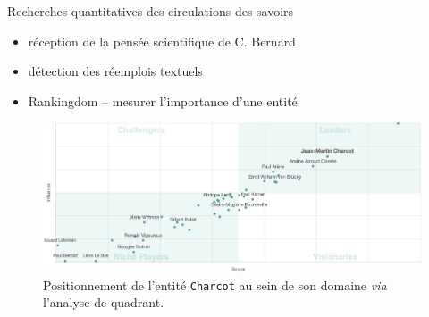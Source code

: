 \begin{frame}{Recherches quantitatives des circulations des savoirs}
	\begin{itemize}
	\item réception de la pensée scientifique de C. Bernard \citep{riguet2018impact}
\item détection des réemplois textuels
\citep{fedchenko2024recherche}
\item Rankingdom -- mesurer l'importance d’une entité \citep{soulet2024}
\end{itemize}
\begin{figure}[!h]
\centering
\includegraphics[width=1\textwidth]{pic/analyse_quadrant.png}
\caption{Positionnement de l'entité \texttt{Charcot} au sein de son domaine \textit{via} l'analyse de quadrant.}
\end{figure}
\end{frame}




